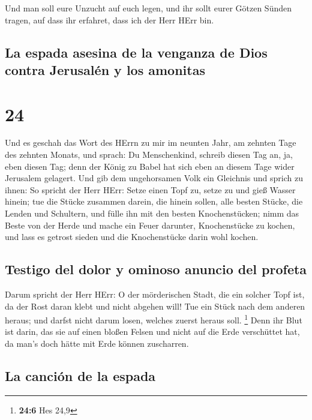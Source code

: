  Und man soll eure Unzucht auf euch legen, und ihr sollt
eurer Götzen Sünden tragen, auf dass ihr erfahret, dass ich der Herr
HErr bin.

\hypertarget{la-espada-asesina-de-la-venganza-de-dios-contra-jerusaluxe9n-y-los-amonitas}{%
\subsection{La espada asesina de la venganza de Dios contra Jerusalén y
los
amonitas}\label{la-espada-asesina-de-la-venganza-de-dios-contra-jerusaluxe9n-y-los-amonitas}}

\hypertarget{section-23}{%
\section{24}\label{section-23}}

 Und es geschah das Wort des HErrn zu mir im neunten Jahr,
am zehnten Tage des zehnten Monats, und sprach:  Du
Menschenkind, schreib diesen Tag an, ja, eben diesen Tag; denn der König
zu Babel hat sich eben an diesem Tage wider Jerusalem gelagert.
 Und gib dem ungehorsamen Volk ein Gleichnis und sprich zu
ihnen: So spricht der Herr HErr: Setze einen Topf zu, setze zu und gieß
Wasser hinein;  tue die Stücke zusammen darein, die hinein
sollen, alle besten Stücke, die Lenden und Schultern, und fülle ihn mit
den besten Knochenstücken;  nimm das Beste von der Herde
und mache ein Feuer darunter, Knochenstücke zu kochen, und lass es
getrost sieden und die Knochenstücke darin wohl kochen.

\hypertarget{testigo-del-dolor-y-ominoso-anuncio-del-profeta}{%
\subsection{Testigo del dolor y ominoso anuncio del
profeta}\label{testigo-del-dolor-y-ominoso-anuncio-del-profeta}}

 Darum spricht der Herr HErr: O der mörderischen Stadt,
die ein solcher Topf ist, da der Rost daran klebt und nicht abgehen
will! Tue ein Stück nach dem anderen heraus; und darfst nicht darum
losen, welches zuerst heraus soll. \footnote{\textbf{24:6} Hes 24,9}
 Denn ihr Blut ist darin, das sie auf einen bloßen Felsen
und nicht auf die Erde verschüttet hat, da man's doch hätte mit Erde
können zuscharren.

\hypertarget{la-canciuxf3n-de-la-espada}{%
\subsection{La canción de la espada}\label{la-canciuxf3n-de-la-espada}}

